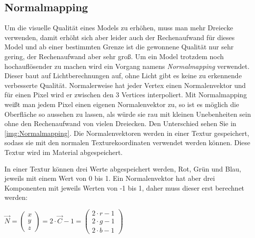 \subsection{Normalmapping}
\label{section:Normalmapping}

Um die visuelle Qualität eines Models zu erhöhen, muss man mehr Dreiecke verwenden, damit erhöht sich aber leider auch der Rechenaufwand für dieses Model und ab einer bestimmten Grenze ist die gewonnene Qualität nur sehr gering, der Rechenaufwand aber sehr groß. Um ein Model trotzdem noch hochauflösender zu machen wird ein Vorgang namens \textit{Normalmapping} verwendet. Dieser baut auf Lichtberechnungen auf, ohne Licht gibt es keine zu erkennende verbesserte Qualität. Normalerweise hat jeder Vertex einen Normalenvektor und für einen Pixel wird er zwischen den 3 Vertices interpoliert. Mit Normalmapping weißt man jedem Pixel einen eigenen Normalenvektor zu, so ist es möglich die Oberfläche so aussehen zu lassen, als würde sie rau mit kleinen Unebenheiten sein ohne den Rechenaufwand von vielen Dreiecken. Den Unterschied sehen Sie in \cref{img:Normalmapping}. Die Normalenvektoren werden in einer Textur gespeichert, sodass sie mit den normalen Texturekoordinaten verwendet werden können. Diese Textur wird im Material abgespeichert.

In einer Textur können drei Werte abgespeichert werden, Rot, Grün und Blau, jeweils mit einem Wert von 0 bis 1. Ein Normalenvektor hat aber drei Komponenten mit jeweils Werten von -1 bis 1, daher muss dieser erst berechnet werden:

$ \overrightarrow{N} = 
\begin{pmatrix}
x \\ y \\ z
\end{pmatrix}
 = 2 \cdot \overrightarrow{C} - 1 = 
 \begin{pmatrix}
 2 \cdot r - 1 \\ 2 \cdot g - 1 \\ 2 \cdot b - 1
 \end{pmatrix}$
 

